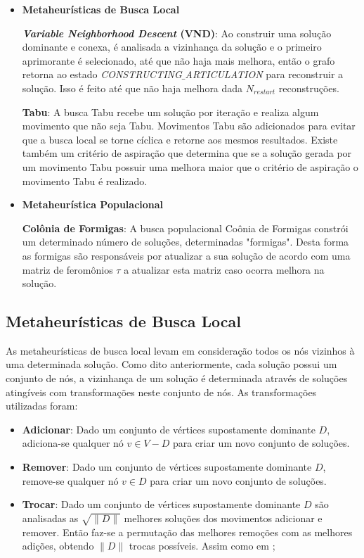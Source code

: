 \documentclass[conference,compsoc]{IEEEtran}
\begin{document}
\begin{itemize}
    \item \textbf{Metaheurísticas de Busca Local}
    
    \subitem \textbf{\textit{Variable Neighborhood Descent} (VND)}: Ao construir uma solução dominante e conexa, é analisada a vizinhança da solução e o primeiro aprimorante é selecionado, até que não haja mais melhora, então o grafo retorna ao estado \textit{CONSTRUCTING$\_$ARTICULATION} para reconstruir a solução. Isso é feito até que não haja melhora dada $N_{restart}$ reconstruções.
    
    \subitem \textbf{Tabu}: A busca Tabu recebe um solução por iteração e realiza algum movimento que não seja Tabu. Movimentos Tabu são adicionados para evitar que a busca local se torne cíclica e retorne aos mesmos resultados. Existe também um critério de aspiração que determina que se a solução gerada por um movimento Tabu possuir uma melhora maior que o critério de aspiração o movimento Tabu é realizado.
    
    \item \textbf{Metaheurística Populacional}
    
    \subitem \textbf{Colônia de Formigas}: A busca populacional Coônia de Formigas constrói um determinado número de soluções, determinadas "formigas". Desta forma as formigas são responsáveis por atualizar a sua solução de acordo com uma matriz de feromônios $\tau$ a atualizar esta matriz caso ocorra melhora na solução.
    
\end{itemize}

\subsection{Metaheurísticas de Busca Local}

As metaheurísticas de busca local levam em consideração todos os nós vizinhos à uma determinada solução. Como dito anteriormente, cada solução possui um conjunto de nós, a vizinhança de um solução é determinada através de soluções atingíveis com transformações neste conjunto de nós. As transformações utilizadas foram:

\begin{itemize}
    \item \textbf{Adicionar}: Dado um conjunto de vértices supostamente dominante $D$, adiciona-se qualquer nó $v \in V - D$ para criar um novo conjunto de soluções.
    
    \item \textbf{Remover}: Dado um conjunto de vértices supostamente dominante $D$, remove-se qualquer nó $v \in D$ para criar um novo conjunto de soluções.
    
    \item \textbf{Trocar}: Dado um conjunto de vértices supostamente dominante $D$ são analisadas as $\sqrt{\| D \|}$ melhores soluções dos movimentos adicionar e remover. Então faz-se a permutação das melhores remoções com as melhores adições, obtendo $\| D \|$ trocas possíveis. Assim como em \cite{Mayra};
\end{itemize}
\end{document}
